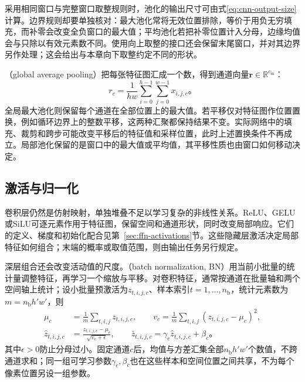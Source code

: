 采用相同窗口与完整窗口取整规则时，池化的输出尺寸可由式\eqref{eq:cnn-output-size}计算。边界规则却要单独核对：最大池化常将无效位置排除，等价于用负无穷填充，而补零会改变全负窗口的最大值；平均池化若把补零位置计入分母，边缘均值会与只除以有效元素数不同。使用向上取整的接口还会保留末尾窗口，并对其边界另作处理；这会给出与本章向下取整约定不同的形状。

（global average pooling）把每张特征图汇成一个数，得到通道向量$\bm r\in\mathbb R^{c_{\mathrm{in}}}$：
\begin{equation}
  r_c=\frac1{hw}\sum_{i=0}^{h-1}\sum_{j=0}^{w-1}x_{i,j,c}\text{。}
  \label{eq:cnn-global-average-pooling}
\end{equation}
全局最大池化则保留每个通道在全部位置上的最大值。若平移仅对特征图作位置置换，例如循环边界上的整数平移，这两种汇聚都保持结果不变。实际网络中的填充、裁剪和跨步可能改变平移后的特征值和采样位置，此时上述置换条件不再成立。局部池化保留的是窗口中的最大值或平均值，其平移性质也由窗口如何移动决定。

\subsection{激活与归一化}
\label{sec:cnn-activation-normalization}

卷积层仍然是仿射映射，单独堆叠不足以学习复杂的非线性关系。ReLU、GELU或SiLU可逐元素作用于特征图，保留空间和通道形状，同时改变局部响应。它们的定义、梯度和初始化配合见第~\ref{sec:ffn-activations}节。这些隐藏层激活决定局部特征如何组合；末端的概率或取值范围，则由输出任务另行规定。

深层组合还会改变活动值的尺度。（batch normalization, BN）用当前小批量的统计量调整特征，再学习一个缩放与平移。对卷积特征，通常按通道在批量轴和两个空间轴上统计；设小批量预激活为$z_{t,i,j,c}$、样本索引$t=1,\ldots,n_{\mathrm b}$，统计元素数为$m=n_{\mathrm b}h'w'$，则
\begin{equation}
  \begin{aligned}
    \mu_c&=\frac1m\sum_{t,i,j}z_{t,i,j,c},\qquad
    v_c=\frac1m\sum_{t,i,j}(z_{t,i,j,c}-\mu_c)^2,\\
    \widehat z_{t,i,j,c}&=\frac{z_{t,i,j,c}-\mu_c}{\sqrt{v_c+\epsilon}},\qquad
    \bar z_{t,i,j,c}=\gamma_c\widehat z_{t,i,j,c}+\beta_c\text{。}
  \end{aligned}
  \label{eq:cnn-batch-normalization}
\end{equation}
其中$\epsilon>0$防止分母过小。固定通道$c$后，均值与方差汇集全部$n_{\mathrm b}h'w'$个数值，不跨通道求和；同一组可学习参数$\gamma_c,\beta_c$也在这些样本和空间位置之间共享，不为每个像素位置另设一组参数。

